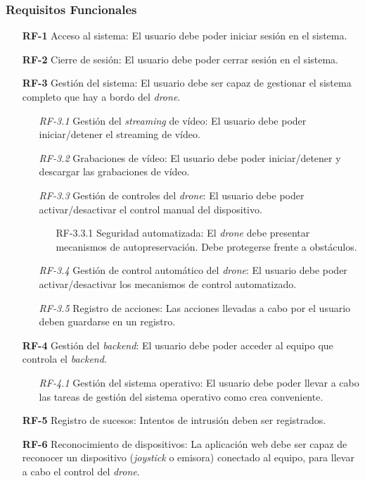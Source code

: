 \subsubsection{Requisitos Funcionales}
\begin{itemize}
\item[\textbf{RF-1}] Acceso al sistema: El usuario debe poder iniciar sesión en el sistema.

\item[\textbf{RF-2}] Cierre de sesión: El usuario debe poder cerrar sesión en el sistema.

\item[\textbf{RF-3}] Gestión del sistema: El usuario debe ser capaz de gestionar el sistema completo que hay a bordo del \emph{drone}.

	\begin{itemize}

			\item[\textit{RF-3.1}] Gestión del \emph{streaming} de vídeo: El usuario debe poder iniciar/detener el streaming de vídeo.
			\item[\textit{RF-3.2}] Grabaciones de vídeo: El usuario debe poder iniciar/detener y descargar las grabaciones de vídeo.
			\item[\textit{RF-3.3}] Gestión de controles del \emph{drone}: El usuario debe poder activar/desactivar el control manual del dispositivo.
				\begin{itemize}
					\item[RF-3.3.1] Seguridad automatizada: El \emph{drone} debe presentar mecanismos de autopreservación. Debe protegerse frente a obstáculos.
				\end{itemize}
			\item[\textit{RF-3.4}] Gestión de control automático del \emph{drone}: El usuario debe poder activar/desactivar los mecanismos de control automatizado.

		\item[\textit{RF-3.5}] Registro de acciones: Las acciones llevadas a cabo por el usuario deben guardarse en un registro.
		\end{itemize}
		
\item[\textbf{RF-4}] Gestión del \emph{backend}: El usuario debe poder acceder al equipo que controla el \emph{backend}.
			\begin{itemize}
				\item[\textit{RF-4.1}] Gestión del sistema operativo: El usuario debe poder llevar a cabo las tareas de gestión del sistema operativo como crea conveniente.
			\end{itemize}		
	

\item[\textbf{RF-5}] Registro de sucesos: Intentos de intrusión deben ser registrados.

\item[\textbf{RF-6}] Reconocimiento de dispositivos: La aplicación web debe ser capaz de reconocer un dispositivo (\emph{joystick} o emisora) conectado al equipo, para llevar a cabo el control del \emph{drone}.


\end{itemize}


